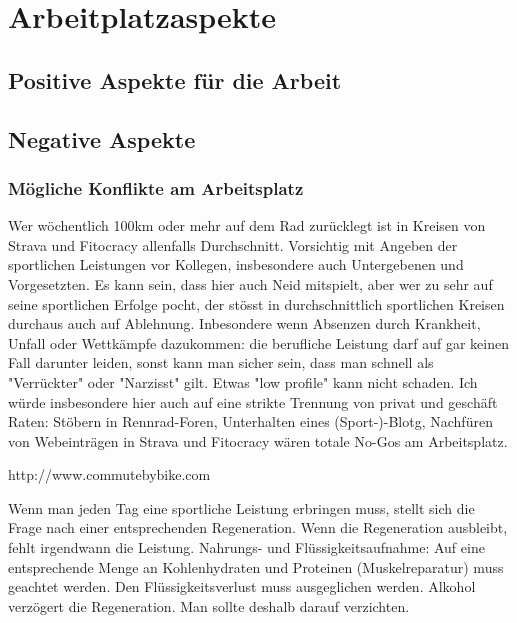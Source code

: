 \chapter{Arbeitplatzaspekte}

\section{Positive Aspekte für die Arbeit}

\section{Negative Aspekte}

\subsection{Mögliche Konflikte am Arbeitsplatz}

Wer wöchentlich 100km oder mehr auf dem Rad zurücklegt ist in Kreisen von Strava und Fitocracy allenfalls Durchschnitt.
Vorsichtig mit Angeben der sportlichen Leistungen vor Kollegen, insbesondere auch Untergebenen und Vorgesetzten.
Es kann sein, dass hier auch Neid mitspielt, aber wer zu sehr auf seine sportlichen Erfolge pocht,
der stösst in durchschnittlich sportlichen Kreisen durchaus auch auf Ablehnung.
Inbesondere wenn Absenzen durch Krankheit, Unfall oder Wettkämpfe dazukommen:
die berufliche Leistung darf auf gar keinen Fall darunter leiden, sonst kann man sicher sein, dass man schnell als "Verrückter" oder "Narzisst" gilt.
Etwas "low profile" kann nicht schaden. Ich würde insbesondere hier auch auf eine strikte Trennung von privat und geschäft Raten: Stöbern in Rennrad-Foren, Unterhalten eines (Sport-)-Blotg, Nachfüren von Webeinträgen in Strava und Fitocracy wären totale No-Gos am Arbeitsplatz.

http://www.commutebybike.com

Wenn man jeden Tag eine sportliche Leistung erbringen muss, stellt sich die Frage nach einer entsprechenden Regeneration. Wenn die Regeneration ausbleibt, fehlt irgendwann die Leistung.
Nahrungs- und Flüssigkeitsaufnahme: Auf eine entsprechende Menge an Kohlenhydraten und Proteinen (Muskelreparatur) muss geachtet werden. Den Flüssigkeitsverlust muss ausgeglichen werden.
Alkohol verzögert die Regeneration. Man sollte deshalb darauf verzichten.



